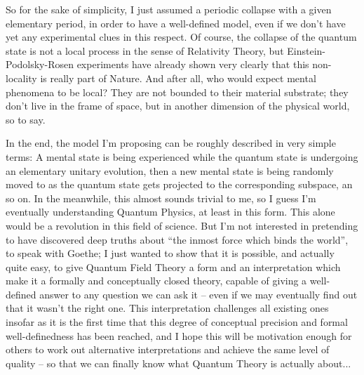 So for the sake of simplicity, I just assumed a periodic collapse with a given elementary period, in order to have a well-defined model, even if we don't have yet any experimental clues in this respect.
Of course, the collapse of the quantum state is not a local process in the sense of Relativity Theory, but Einstein-Podolsky-Rosen experiments have already shown very clearly that this non-locality is really part of Nature.
And after all, who would expect mental phenomena to be local? They are not bounded to their material substrate; they don't live in the frame of space, but in another dimension of the physical world, so to say.

In the end, the model I'm proposing can be roughly described in very simple terms: A mental state is being experienced while the quantum state is undergoing an elementary unitary evolution, then a new mental state is being randomly moved to as the quantum state gets projected to the corresponding subspace, an so on.
In the meanwhile, this almost sounds trivial to me, so I guess I'm eventually understanding Quantum Physics, at least in this form.
This alone would be a revolution in this field of science.
But I'm not interested in pretending to have discovered deep truths about ``the inmost force which binds the world'', to speak with Goethe; I just wanted to show that it is possible, and actually quite easy, to give Quantum Field Theory a form and an interpretation which make it a formally and conceptually closed theory, capable of giving a well-defined answer to any question we can ask it -- even if we may eventually find out that it wasn't the right one.
This interpretation challenges all existing ones insofar as it is the first time that this degree of conceptual precision and formal well-definedness has been reached, and I hope this will be motivation enough for others to work out alternative interpretations and achieve the same level of quality -- so that we can finally know what Quantum Theory is actually about...
